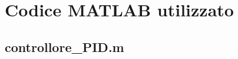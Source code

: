 \section{Codice MATLAB utilizzato}
\label{app:MATLAB}
	
	\subsection{controllore\_PID.m}
	\label{subapp:controllorePID}
	
	